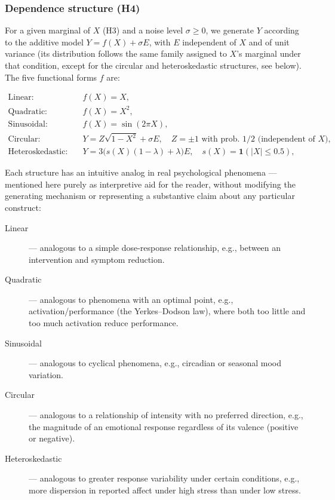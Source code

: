 \documentclass[article]{ajs}
\begin{document}
\subsubsection{Dependence structure (H4)}

For a given marginal of $X$ (H3) and a noise level $\sigma \ge 0$, we
generate $Y$ according to the additive model $Y = f(X) + \sigma E$,
with $E$ independent of $X$ and of unit variance (its distribution
follows the same family assigned to $X$'s marginal under that
condition, except for the circular and heteroskedastic structures, see
below). The five functional forms $f$ are:

\begin{align*}
\text{Linear:} &\quad f(X) = X, \\
\text{Quadratic:} &\quad f(X) = X^2, \\
\text{Sinusoidal:} &\quad f(X) = \sin(2\pi X), \\
\text{Circular:} &\quad Y = Z\sqrt{1-X^2} + \sigma E, \quad Z = \pm 1 \text{ with prob.\ } 1/2 \text{ (independent of $X$)}, \\
\text{Heteroskedastic:} &\quad Y = 3\big(s(X)(1-\lambda)+\lambda\big)E, \quad s(X) = \mathbf{1}(|X|\le 0.5),
\end{align*}

Each structure has an intuitive analog in real psychological
phenomena --- mentioned here purely as interpretive aid for the
reader, without modifying the generating mechanism or representing a
substantive claim about any particular construct:

\begin{description}
\item[Linear] --- analogous to a simple dose-response relationship, e.g., between an intervention and symptom reduction.
\item[Quadratic] --- analogous to phenomena with an optimal point, e.g., activation/performance (the Yerkes--Dodson law), where both too little and too much activation reduce performance.
\item[Sinusoidal] --- analogous to cyclical phenomena, e.g., circadian or seasonal mood variation.
\item[Circular] --- analogous to a relationship of intensity with no preferred direction, e.g., the magnitude of an emotional response regardless of its valence (positive or negative).
\item[Heteroskedastic] --- analogous to greater response variability under certain conditions, e.g., more dispersion in reported affect under high stress than under low stress.
\end{description}
\end{document}
